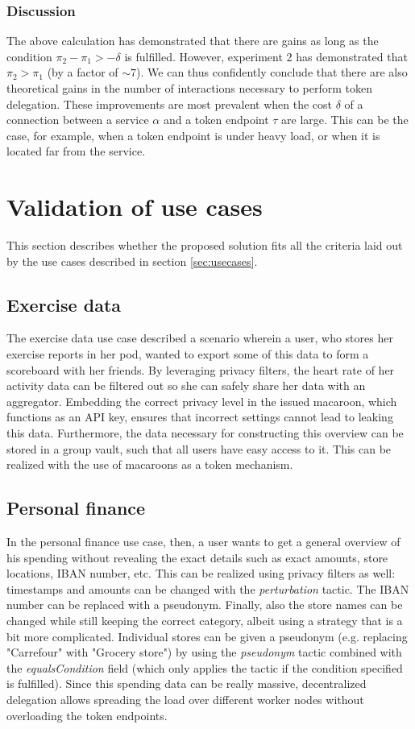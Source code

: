 \subsubsection{Discussion}
The above calculation has demonstrated that there are gains as long as the condition $\pi_2 - \pi_1 > -\delta$ is fulfilled. However, experiment 2 has demonstrated that $\pi_2 > \pi_1$ (by a factor of $\sim 7$). We can thus confidently conclude that there are also theoretical gains in the number of interactions necessary to perform token delegation. These improvements are most prevalent when the cost $\delta$ of a connection between a service $\alpha$ and a token endpoint $\tau$ are large. This can be the case, for example, when a token endpoint is under heavy load, or when it is located far from the service.


\section{Validation of use cases}
This section describes whether the proposed solution fits all the criteria laid out by the use cases described in section \ref{sec:usecases}.

\subsection{Exercise data}
The exercise data use case described a scenario wherein a user, who stores her exercise reports in her pod, wanted to export some of this data to form a scoreboard with her friends. By leveraging privacy filters, the heart rate of her activity data can be filtered out so she can safely share her data with an aggregator. Embedding the correct privacy level in the issued macaroon, which functions as an API key, ensures that incorrect settings cannot lead to leaking this data. Furthermore, the data necessary for constructing this overview can be stored in a group vault, such that all users have easy access to it. This can be realized with the use of macaroons as a token mechanism. 

\subsection{Personal finance}
In the personal finance use case, then, a user wants to get a general overview of his spending without revealing the exact details such as exact amounts, store locations, IBAN number, etc. This can be realized using privacy filters as well: timestamps and amounts can be changed with the \textit{perturbation} tactic. The IBAN number can be replaced with a pseudonym. Finally, also the store names can be changed while still keeping the correct category, albeit using a strategy that is a bit more complicated. Individual stores can be given a pseudonym (e.g. replacing "Carrefour" with "Grocery store") by using the \textit{pseudonym} tactic combined with the \textit{equalsCondition} field (which only applies the tactic if the condition specified is fulfilled). Since this spending data can be really massive, decentralized delegation allows spreading the load over different worker nodes without overloading the token endpoints.

